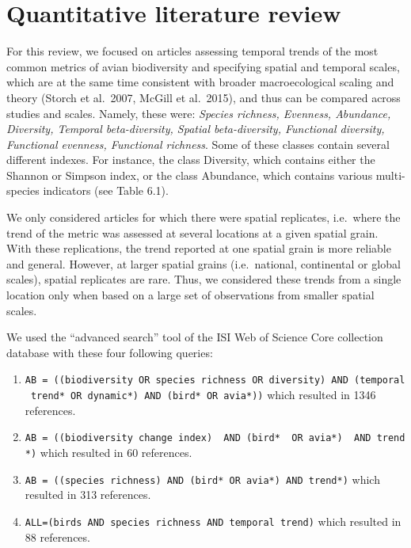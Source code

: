 \documentclass[
  12pt,
  oneside]{report}
\begin{document}
\hypertarget{quantitative-literature-review}{%
\chapter{Quantitative literature review}\label{quantitative-literature-review}}

For this review, we focused on articles assessing temporal trends of the most common metrics of avian biodiversity and specifying spatial and temporal scales, which are at the same time consistent with broader macroecological scaling and theory (Storch et al.~2007, McGill et al.~2015), and thus can be compared across studies and scales. Namely, these were: \emph{Species richness, Evenness, Abundance, Diversity, Temporal beta-diversity, Spatial beta-diversity, Functional diversity, Functional evenness, Functional richness}. Some of these classes contain several different indexes. For instance, the class Diversity, which contains either the Shannon or Simpson index, or the class Abundance, which contains various multi-species indicators (see Table 6.1).

We only considered articles for which there were spatial replicates, i.e.~where the trend of the metric was assessed at several locations at a given spatial grain. With these replications, the trend reported at one spatial grain is more reliable and general. However, at larger spatial grains (i.e.~national, continental or global scales), spatial replicates are rare. Thus, we considered these trends from a single location only when based on a large set of observations from smaller spatial scales.

We used the ``advanced search'' tool of the ISI Web of Science Core collection database with these four following queries:

\begin{enumerate}
\def\labelenumi{\arabic{enumi}.}
\item
  \texttt{AB\ =\ ((biodiversity\ OR\ species\ richness\ OR\ diversity)\ AND\ (temporal\ trend*\ OR\ dynamic*)\ AND\ (bird*\ OR\ avia*))} which resulted in 1346 references.
\item
  \texttt{AB\ =\ ((biodiversity\ change\ index)\ \ AND\ (bird*\ \ OR\ avia*)\ \ AND\ trend*)} which resulted in 60 references.
\item
  \texttt{AB\ =\ ((species\ richness)\ AND\ (bird*\ OR\ avia*)\ AND\ trend*)} which resulted in 313 references.
\item
  \texttt{ALL=(birds\ AND\ species\ richness\ AND\ temporal\ trend)} which resulted in 88 references.
\end{enumerate}
\end{document}
